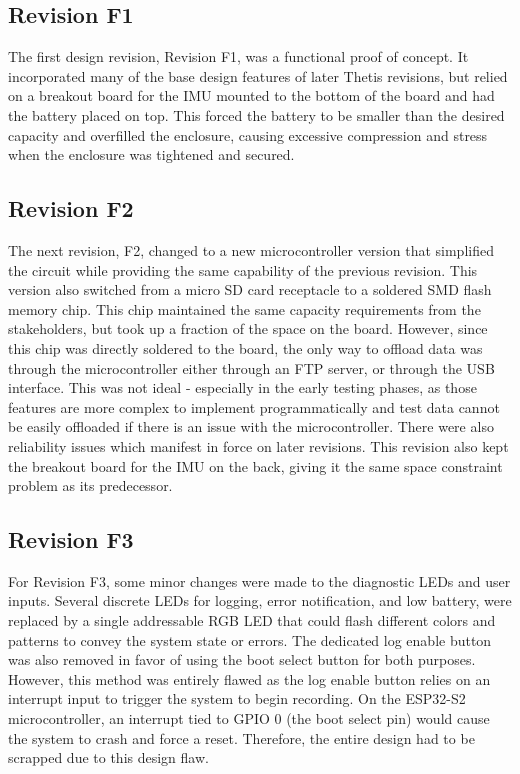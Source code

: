 \subsection{Revision F1} 
The first design revision, Revision F1, was a functional proof of concept.
It incorporated many of the base design features of later Thetis revisions, but relied on a breakout board for the IMU mounted to the bottom of the board and had the battery placed on top.
This forced the battery to be smaller than the desired capacity and overfilled the enclosure, causing excessive compression and stress when the enclosure was tightened and secured.


\subsection{Revision F2} 
The next revision, F2, changed to a new microcontroller version that simplified the circuit while providing the same capability of the previous revision.
This version also switched from a micro SD card receptacle to a soldered SMD flash memory chip.
This chip maintained the same capacity requirements from the stakeholders, but took up a fraction of the space on the board.
However, since this chip was directly soldered to the board, the only way to offload data was through the microcontroller either through an FTP server, or through the USB interface.
This was not ideal - especially in the early testing phases, as those features are more complex to implement programmatically and test data cannot be easily offloaded if there is an issue with the microcontroller.
There were also reliability issues which manifest in force on later revisions.
This revision also kept the breakout board for the IMU on the back, giving it the same space constraint problem as its predecessor.


\subsection{Revision F3} 
For Revision F3, some minor changes were made to the diagnostic LEDs and user inputs.
Several discrete LEDs for logging, error notification, and low battery, were replaced by a single addressable RGB LED that could flash different colors and patterns to convey the system state or errors.
The dedicated log enable button was also removed in favor of using the boot select button for both purposes.
However, this method was entirely flawed as the log enable button relies on an interrupt input to trigger the system to begin recording.
On the ESP32-S2 microcontroller, an interrupt tied to GPIO 0 (the boot select pin) would cause the system to crash and force a reset.
Therefore, the entire design had to be scrapped due to this design flaw.

